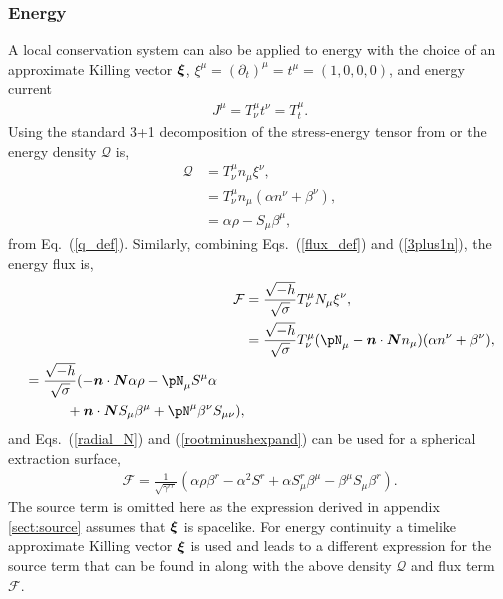 \subsubsection{Energy} \label{sect:energy}
A local conservation system can also be applied to energy with the choice of an approximate Killing vector $\boldsymbol{\xi}$, $\xi^\mu = (\partial_t)^\mu = t^\mu =(1,0,0,0)$, and energy current
\begin{align}
\label{energycurrent} J^\mu = T^\mu_\nu t^\nu = T^\mu_t.
\end{align}
 Using the standard 3+1 decomposition of the stress-energy tensor from \cite{gourgoulhon20073+} or \cite{alcubierre2008introduction} the energy density $\mathcal{Q}$ is,
\begin{align}
\mathcal{Q} &= T^\mu_\nu n_\mu \xi^\nu, \\
            &= T^\mu_\nu n_\mu (\alpha n^\nu+ \beta^\nu), \\
            &= \alpha \rho - S_\mu \beta^\mu,
\end{align}
from Eq.~(\ref{q_def}). Similarly, combining Eqs.~(\ref{flux_def}) and (\ref{3plus1n}), the energy flux is,
\begin{align}\mathcal{F} &= \frac{\sqrt{-h}}{\sqrt{\sigma}}T^\mu_\nu N_\mu \xi^\nu, \\
            &= \frac{\sqrt{-h}}{\sqrt{\sigma}}T^\mu_\nu (\pN_\mu - \bs{n}\cdot \bs{N} n_\mu) (\alpha n^\nu + \beta^\nu), \\
    \begin{split} &= \frac{\sqrt{-h}}{\sqrt{\sigma}}(-\bs{n}\cdot \bs{N}\alpha\rho -  \pN_\mu S^\mu \alpha \\&\quad\quad\quad+ \bs{n}\cdot \bs{N} S_\mu \beta^\mu + \pN^\mu \beta^\nu S_{\mu\nu}), \end{split}
\end{align} 
and Eqs.~(\ref{radial_N}) and (\ref{rootminushexpand}) can be used for a spherical extraction surface,
\begin{align} 
 \mathcal{F} = \frac{1}{\sqrt{\gamma^{rr}}}(\alpha \rho \beta^r - \alpha^2 S^r   +  \alpha S^r_\mu\beta^\mu - \beta^\mu S_\mu \beta^r ). 
\end{align} 
 The source term is omitted here as the expression derived in appendix \ref{sect:source} assumes that $\boldsymbol{\xi}$ is spacelike. For energy continuity a timelike approximate Killing vector $\boldsymbol{\xi}$ is used and leads to a different expression for the source term that can be found in \cite{Clough_2021} along with the above density $\mathcal{Q}$ and flux term $\mathcal{F}$. 
















